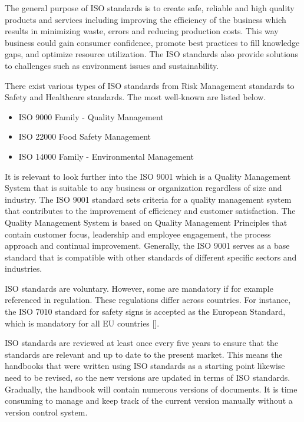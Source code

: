 The general purpose of ISO standards is to create safe, reliable and high quality products and services including improving the efficiency of the business which results in minimizing waste, errors and reducing production costs. This way business could gain consumer confidence, promote best practices to fill knowledge gaps, and optimize resource utilization. The ISO standards also provide solutions to challenges such as environment issues and sustainability.

There exist various types of ISO standards from Risk Management standards to Safety and Healthcare standards. The most well-known are listed below.

\begin{itemize}
	\item ISO 9000 Family - Quality Management
	\item ISO 22000 Food Safety Management
	\item ISO 14000 Family - Environmental Management
\end{itemize}

It is relevant to look further into the ISO 9001 which is a Quality Management System that is suitable to any business or organization regardless of size and industry. The ISO 9001 standard sets criteria for a quality management system that contributes to the improvement of efficiency and customer satisfaction. The Quality Management System is based on Quality Management Principles that contain customer focus, leadership and employee engagement, the process approach and continual improvement. Generally, the ISO 9001 serves as a base standard that is compatible with other standards of different specific sectors and industries.

ISO standards are voluntary. However, some are mandatory if for example referenced in regulation. These regulations differ across countries. For instance, the ISO 7010 standard for safety signs is accepted as the European Standard, which is mandatory for all EU countries [].

ISO standards are reviewed at least once every five years to ensure that the standards are relevant and up to date to the present market. This means the handbooks that were written using ISO standards as a starting point likewise need to be revised, so the new versions are updated in terms of ISO standards. Gradually, the handbook will contain numerous versions of documents. It is time consuming to manage and keep track of the current version manually without a version control system.
